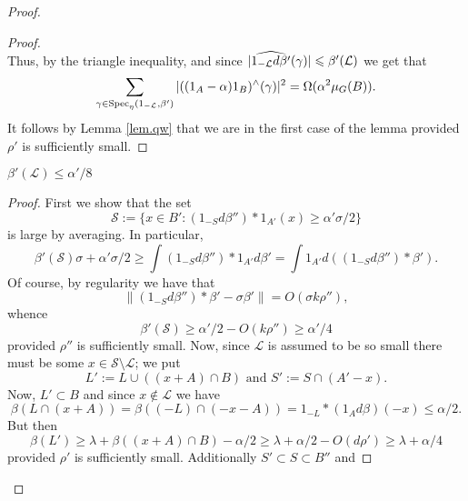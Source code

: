 \documentclass[12pt]{amsart}  %
\begin{document}
\begin{proof}
\begin{proof}
\begin{equation*}
\end{equation*}
Thus, by the triangle inequality, and since $|\widehat{1_{-\mathcal{L}}d\beta'}(\gamma)| \leqslant \beta'(\mathcal{L})$ we get that
\begin{equation*}
\sum_{\gamma \in \mathop{\rm Spec}\nolimits_\eta(1_{-\mathcal{L}},\beta')}{|((1_A -\alpha)1_B)^\wedge(\gamma)|^2} = \Omega(\alpha^2\mu_G(B)).
\end{equation*}
It follows by Lemma \ref{lem.qw} that we are in the first case of the lemma provided $\rho'$ is sufficiently small.
\end{proof}
\begin{case*}$\beta'(\mathcal{L}) \leq \alpha'/8$
\end{case*}
\begin{proof}
First we show that the set
\begin{equation*}
\mathcal{S}:=\{x \in B':(1_{-S}d\beta'') \ast 1_{A'}(x)\geq \alpha' \sigma/2\}
\end{equation*}
is large by averaging.  In particular, 
\begin{equation*}
\beta'(\mathcal{S})\sigma + \alpha'\sigma/2 \geq \int{(1_{-S}d\beta'') \ast 1_{A'}d\beta'} = \int{1_{A'} d((1_{-S}d\beta'')\ast \beta')}.
\end{equation*}
Of course, by regularity we have that
\begin{equation*}
\|(1_{-S}d\beta'') \ast \beta' - \sigma \beta'\| = O(\sigma k \rho''),
\end{equation*}
whence
\begin{equation*}
\beta'(\mathcal{S}) \geq \alpha'/2 - O(k\rho'') \geq \alpha'/4
\end{equation*}
provided $\rho''$ is sufficiently small.  Now, since $\mathcal{L}$ is assumed to be so small there must be some $x \in \mathcal{S} \setminus \mathcal{L}$; we put
\begin{equation*}
L':=L \cup ((x+A)\cap B) \textrm{ and } S':=S \cap (A'-x).
\end{equation*}
Now, $L' \subset B$ and since $x \not \in \mathcal{L}$ we have
\begin{equation*}
\beta(L \cap (x+A)) = \beta((-L) \cap (-x-A)) = 1_{-L} \ast (1_Ad\beta)(-x) \leq \alpha/2.
\end{equation*}
But then
\begin{equation*}
\beta(L') \geq \lambda + \beta((x+A) \cap B) - \alpha/2 \geq \lambda + \alpha/2 - O(d\rho') \geq \lambda +\alpha/4
\end{equation*}
provided $\rho'$ is sufficiently small.  Additionally $S' \subset S \subset B''$ and

\end{proof}
\end{proof}
\end{document}
